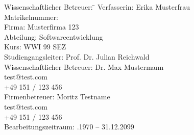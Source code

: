 \begin{titlepage}
\begin{center}
\begin{minipage}{\textwidth}
\begin{tabbing}
	Wissenschaftlicher Betreuer: \hspace{0.85cm}\=\kill
	Verfasserin: \> Erika Musterfrau \\[1mm]
	Matrikelnummer:  \\[1mm]
	Firma: \> Musterfirma 123 \\[1mm]
	Abteilung: \> Softwareentwicklung \\[1mm]
	Kurs: \> WWI 99 SEZ \\[1mm]
	Studiengangsleiter: \> Prof. Dr. Julian Reichwald  \\[1mm]
	Wissenschaftlicher Betreuer: \> Dr. Max Mustermann \\
	\> test@test.com \\
	\> +49 151 / 123 456 \\[1mm]
	Firmenbetreuer: \> Moritz Testname \\
	\> test@test.com \\
	\> +49 151 / 123 456 \\[1mm]
	Bearbeitungszeitraum: .1970 -- 31.12.2099
\end{tabbing}
\end{minipage}

\end{center}

\end{titlepage}